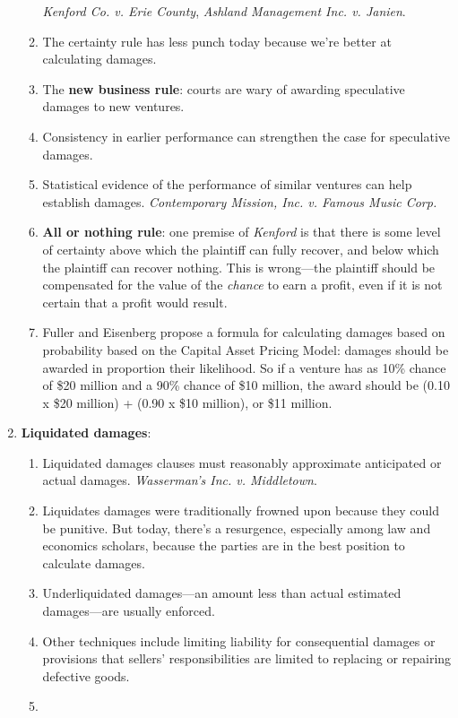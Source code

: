 \begin{enumerate}
\begin{enumerate}
        \emph{Kenford Co. v. Erie County}, \emph{Ashland Management Inc. v. 
        Janien}.
        \item The certainty rule has less punch today because we're better at 
        calculating damages.
        \item The \textbf{new business rule}: courts are wary of awarding 
        speculative damages to new ventures.
        \item Consistency in earlier performance can strengthen the case for 
        speculative damages.
        \item Statistical evidence of the performance of similar ventures can 
        help establish damages. \emph{Contemporary Mission, Inc. v. Famous 
        Music Corp.}
        \item \textbf{All or nothing rule}: one premise of \emph{Kenford} is 
        that there is some level of certainty above which the plaintiff can 
        fully recover, and below which the plaintiff can recover nothing. This 
        is wrong---the plaintiff should be compensated for the value of the 
        \emph{chance} to earn a profit, even if it is not certain that a 
        profit would result.
        \item Fuller and Eisenberg propose a formula for calculating damages 
        based on probability based on the Capital Asset Pricing Model: damages 
        should be awarded in proportion their likelihood.  So if a venture has 
        as 10\% chance of \$20 million and a 90\% chance of \$10 million, the 
        award should be (0.10 x \$20 million) + (0.90 x \$10 million), or \$11 
        million.
    \end{enumerate}
    \item \textbf{Liquidated damages}:
    \begin{enumerate}
        \item Liquidated damages clauses must reasonably approximate 
        anticipated or actual damages. \emph{Wasserman's Inc. v. Middletown}.
        \item Liquidates damages were traditionally frowned upon because they 
        could be punitive. But today, there's a resurgence, especially among 
        law and economics scholars, because the parties are in the best 
        position to calculate damages.
        \item Underliquidated damages---an amount less than actual estimated 
        damages---are usually enforced.
        \item Other techniques include limiting liability for consequential 
        damages or provisions that sellers' responsibilities are limited to 
        replacing or repairing defective goods.
        \item %
    \end{enumerate}
\end{enumerate}

